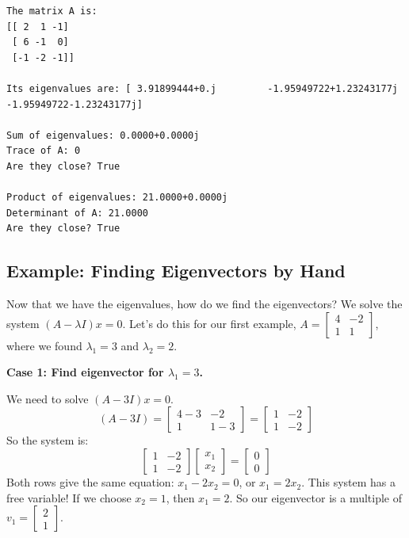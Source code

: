 \documentclass[
  letterpaper,
  DIV=11,
  numbers=noendperiod]{scrreprt}
\begin{document}
\begin{verbatim}
The matrix A is:
[[ 2  1 -1]
 [ 6 -1  0]
 [-1 -2 -1]]

Its eigenvalues are: [ 3.91899444+0.j         -1.95949722+1.23243177j -1.95949722-1.23243177j]

Sum of eigenvalues: 0.0000+0.0000j
Trace of A: 0
Are they close? True

Product of eigenvalues: 21.0000+0.0000j
Determinant of A: 21.0000
Are they close? True
\end{verbatim}

\subsection{Example: Finding Eigenvectors by
Hand}\label{example-finding-eigenvectors-by-hand}

Now that we have the eigenvalues, how do we find the eigenvectors? We
solve the system \((A - \lambda I)x = 0\). Let's do this for our first
example, \(A = \begin{bmatrix} 4 & -2 \\ 1 & 1 \end{bmatrix}\), where we
found \(\lambda_1 = 3\) and \(\lambda_2 = 2\).

\textbf{Case 1: Find eigenvector for \(\lambda_1 = 3\).}

We need to solve \((A - 3I)x = 0\).
\[ (A - 3I) = \begin{bmatrix} 4-3 & -2 \\ 1 & 1-3 \end{bmatrix} = \begin{bmatrix} 1 & -2 \\ 1 & -2 \end{bmatrix} \]
So the system is:
\[ \begin{bmatrix} 1 & -2 \\ 1 & -2 \end{bmatrix} \begin{bmatrix} x_1 \\ x_2 \end{bmatrix} = \begin{bmatrix} 0 \\ 0 \end{bmatrix} \]
Both rows give the same equation: \(x_1 - 2x_2 = 0\), or \(x_1 = 2x_2\).
This system has a free variable! If we choose \(x_2 = 1\), then
\(x_1 = 2\). So our eigenvector is a multiple of
\(v_1 = \begin{bmatrix} 2 \\ 1 \end{bmatrix}\).
\end{document}
